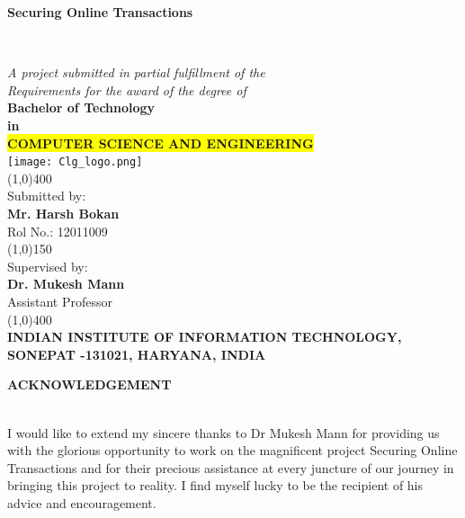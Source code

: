 \documentclass[12pt, oneside, a4paper]{article}
\begin{document}
\begin{center}
    \vspace{0.1cm}
    \begin{Large}\textbf{Securing Online Transactions}\end{Large}\\
    \vspace{1cm}\begin{large}
    \textit{A project submitted in partial fulfillment of the\\
    Requirements for the award of the degree of}\\
    \vspace{0.8cm}
    \textbf{Bachelor of Technology\\ in}\\
    \textbf{\colorbox{yellow}{COMPUTER SCIENCE AND ENGINEERING}}\\
    \vspace{0.6cm}
    \texttt{[image: Clg\_logo.png]}\\
    \vspace{1cm}
    \line(1,0){400}\\\vspace{0.3cm}
    Submitted by:\\
    \textbf{Mr. Harsh Bokan}\\Rol No.: 12011009\\
    \vspace{0.5cm}
    \line(1,0){150}\\
    \vspace{0.5cm}
    Supervised by:\\
    \textbf{Dr. Mukesh Mann}\\
    Assistant Professor\\
    \line(1,0){400}\\
    \vspace{2cm}
    \textbf{INDIAN INSTITUTE OF INFORMATION TECHNOLOGY,\\
    SONEPAT -131021, HARYANA, INDIA}\\\end{large}
\end{center}
\thispagestyle{empty}
\pagebreak
\begin{center}
    \begin{Large}\textbf{ACKNOWLEDGEMENT}\end{Large}
\end{center}\\
\vspace{1cm}
I would like to extend my sincere thanks to Dr Mukesh Mann for providing us with the glorious opportunity to work on the magnificent project Securing Online Transactions and for their precious assistance at every juncture of our journey in bringing this project to reality. I find myself lucky to be the recipient of his advice and encouragement. 
\end{document}
